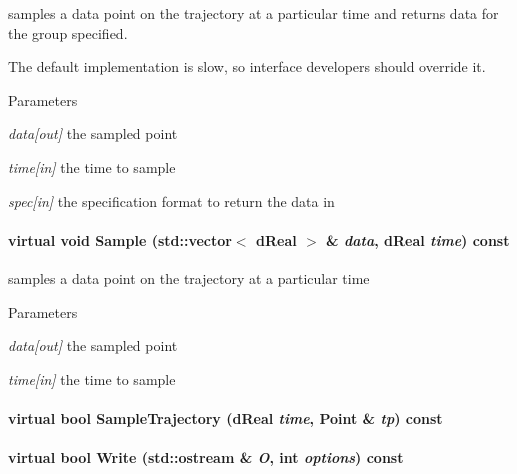 samples a data point on the trajectory at a particular time and returns data for the group specified. 

The default implementation is slow, so interface developers should override it. 
\begin{DoxyParams}{Parameters}
\item[{\em data\mbox{[}out\mbox{]}}]the sampled point \item[{\em time\mbox{[}in\mbox{]}}]the time to sample \item[{\em spec\mbox{[}in\mbox{]}}]the specification format to return the data in \end{DoxyParams}
\hypertarget{classOpenRAVE_1_1TrajectoryBase_a479f3837904daa33d4e11e7fadd28aed}{
\paragraph[{Sample}]{\setlength{\rightskip}{0pt plus 5cm}virtual void Sample (std::vector$<$ dReal $>$ \& {\em data}, \/  dReal {\em time}) const}\hfill}
\label{classOpenRAVE_1_1TrajectoryBase_a479f3837904daa33d4e11e7fadd28aed}


samples a data point on the trajectory at a particular time 


\begin{DoxyParams}{Parameters}
\item[{\em data\mbox{[}out\mbox{]}}]the sampled point \item[{\em time\mbox{[}in\mbox{]}}]the time to sample \end{DoxyParams}
\hypertarget{classOpenRAVE_1_1TrajectoryBase_a59dda2f7a9f5935bf9542c394069f6ee}{
\paragraph[{SampleTrajectory}]{\setlength{\rightskip}{0pt plus 5cm}virtual bool SampleTrajectory (dReal {\em time}, \/  {\bf Point} \& {\em tp}) const}\hfill}
\label{classOpenRAVE_1_1TrajectoryBase_a59dda2f7a9f5935bf9542c394069f6ee}
\hypertarget{classOpenRAVE_1_1TrajectoryBase_af8ac97f47745ae12998f6637e11ceaab}{
\paragraph[{Write}]{\setlength{\rightskip}{0pt plus 5cm}virtual bool Write (std::ostream \& {\em O}, \/  int {\em options}) const}\hfill}
\label{classOpenRAVE_1_1TrajectoryBase_af8ac97f47745ae12998f6637e11ceaab}


